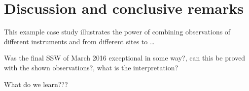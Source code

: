 \section{Discussion and conclusive remarks}
This example case study illustrates the power of combining observations of different instruments and from different sites to \ldots

Was the final SSW of March 2016 exceptional in some way?, can this be proved with the shown observations?, what is the interpretation?

What do we learn???